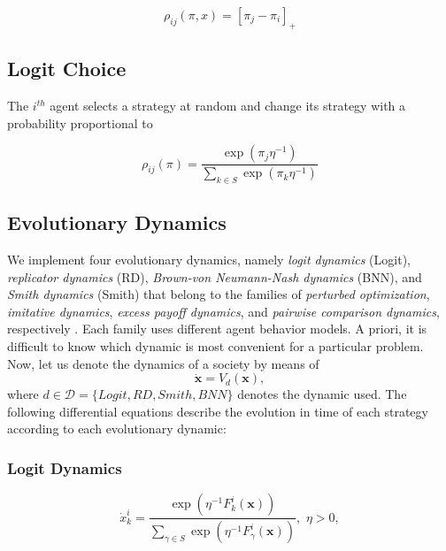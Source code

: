 \documentclass[a4paper,10pt]{article}
\def\th{^{th}}
\newcommand{\bs}[1]{\boldsymbol{#1}}
\begin{document}
\begin{equation}
\rho_{ij}(\pi, x) = \left[ \pi_j - \pi_i \right]_+
\end{equation}





\subsection{Logit Choice}

The $i\th$ agent selects a strategy at random and change its strategy with a probability proportional to 

\begin{equation}
\rho_{ij}(\pi) = \frac{ \exp(\pi_j \eta^{-1} ) }{ \sum_{k \in S} \exp(\pi_k \eta^{-1} ) }
\end{equation}









\subsection{Evolutionary Dynamics} \label{sec:dynamics}

We implement four evolutionary dynamics, namely \emph{logit dynamics} (Logit), \emph{replicator dynamics} (RD), \emph{Brown-von Neumann-Nash dynamics} (BNN), and \emph{Smith dynamics} (Smith) that belong to the families of \emph{perturbed optimization}, \emph{imitative dynamics}, \emph{excess payoff dynamics}, and \emph{pairwise comparison dynamics}, respectively \cite{hofbauer2001nash, sandholm_book}. 
%
%
Each family uses different agent behavior models. A priori, it is difficult to know which dynamic is most convenient for a particular problem. 
Now, let us denote the dynamics of a society by means of 
%
\begin{equation}
\dot{ \bs{x} } = V_d( \bs{x} ),
\end{equation}
where $d\in \mathcal{D}=\{ Logit, RD, Smith, BNN \}$ denotes the dynamic used.
The following differential equations describe the evolution in time of each strategy according to each evolutionary dynamic:
%
\subsubsection{Logit Dynamics}
\begin{equation}\label{eq:logit}
 \dot{x}_k^i = \frac{ \exp\left(\eta^{-1} F_k^i (\bs{x}) \right) }{ \sum_{\gamma \in S} \exp\left(\eta^{-1} F_\gamma^i (\bs{x}) \right) }, \, \, \eta>0,
\end{equation}
\end{document}
